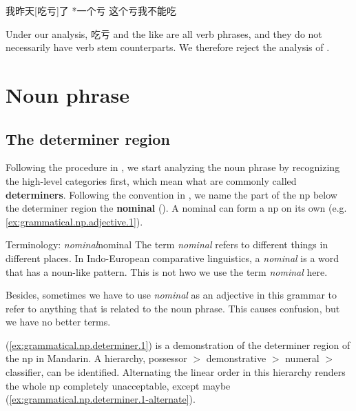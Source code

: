 \documentclass[UTF8, a4paper, oneside, scheme=plain, 12pt]{ctexrep}
\newcommand*{\citepage}[1]{p.~{#1}}
\newcommand*{\textgt}{$>$ }
\newcommand*{\concept}[1]{\textbf{#1}}
\newcommand*{\term}[1]{\emph{#1}}
\begin{document}
\begin{exe}
    \ex\label{ex:grammatical.clause.derivation.idiom.1} \begin{xlist}
        \ex\label{ex:grammatical.clause.derivation.idiom.1.1} 我昨天[吃亏]了
        \ex\label{ex:grammatical.clause.derivation.idiom.1.2} *一个亏
        \ex\label{ex:grammatical.clause.derivation.idiom.1.3} 这个亏我不能吃
    \end{xlist}
\end{exe}

Under our analysis, 吃亏 and the like are all verb phrases,
and they do not necessarily have verb stem counterparts.
We therefore reject the analysis of \citet[\citepage{129}]{zhudexigrammar}.

\section{Noun phrase}\label{sec:grammatical.np}

\subsection{The determiner region}\label{sec:grammatical.np.determiner}

Following the procedure in ,
we start analyzing the noun phrase by recognizing the high-level categories first,
which mean what are commonly called \concept{determiners}.
Following the convention in \citet{cgel},
we name the part of the \ac{np} below the determiner region the \concept{nominal} ().
A nominal can form a \ac{np} on its own (e.g. \ref{ex:grammatical.np.adjective.1}).

\begin{theorybox}{Terminology: \term{nominal}}{nominal}
    The term \term{nominal} refers to different things in different places.
    In Indo-European comparative linguistics, a \term{nominal} is a word that has a noun-like pattern.
    This is not hwo we use the term \term{nominal} here.

    Besides, sometimes we have to use \term{nominal} as an adjective in this grammar
    to refer to anything that is related to the noun phrase.
    This causes confusion, but we have no better terms.
\end{theorybox}

(\ref{ex:grammatical.np.determiner.1}) is a demonstration of 
the determiner region of the \ac{np} in Mandarin.
A hierarchy, possessor \textgt{}demonstrative \textgt{}numeral \textgt{}classifier,
can be identified.
Alternating the linear order in this hierarchy renders the whole \ac{np}
completely unacceptable, except maybe (\ref{ex:grammatical.np.determiner.1-alternate}).
\end{document}
